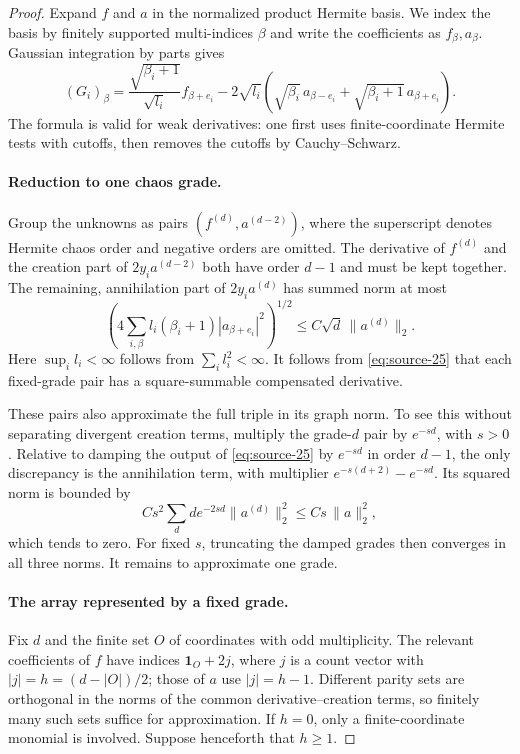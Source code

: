 \begin{proof}
Expand $f$ and $a$ in the normalized product Hermite basis. We index the
basis by finitely supported multi-indices $\beta$ and write the
coefficients as $f_\beta,a_\beta$. Gaussian integration by parts gives
\begin{equation}
 (G_i)_\beta
 =\frac{\sqrt{\beta_i+1}}{\sqrt{l_i}}f_{\beta+e_i}
 -2\sqrt{l_i}\left(
      \sqrt{\beta_i}\,a_{\beta-e_i}
      +\sqrt{\beta_i+1}\,a_{\beta+e_i}\right).
 \label{eq:source-25}
\end{equation}
The formula is valid for weak derivatives: one first uses finite-coordinate
Hermite tests with cutoffs, then removes the cutoffs by Cauchy--Schwarz.

\paragraph{Reduction to one chaos grade.}
Group the unknowns as pairs $(f^{(d)},a^{(d-2)})$, where the superscript
denotes Hermite chaos order and negative orders are omitted. The derivative
of $f^{(d)}$ and the creation part of $2y_i a^{(d-2)}$ both have order
$d-1$ and must be kept together. The remaining, annihilation part of
$2y_i a^{(d)}$ has summed norm at most
\[
 \left(4\sum_{i,\beta}l_i(\beta_i+1)
                  |a_{\beta+e_i}|^2\right)^{1/2}
 \le C\sqrt d\,\|a^{(d)}\|_2.
\]
Here $\sup_i l_i<\infty$ follows from $\sum_i l_i^2<\infty$.
It follows from \eqref{eq:source-25} that each fixed-grade pair has a
square-summable compensated derivative.

These pairs also approximate the full triple in its graph norm. To see
this without separating divergent creation terms, multiply the grade-$d$
pair by $e^{-sd}$, with $s>0$. Relative to damping the output of
\eqref{eq:source-25} by $e^{-sd}$ in order $d-1$, the only discrepancy
is the annihilation term, with multiplier
$e^{-s(d+2)}-e^{-sd}$. Its squared norm is bounded by
\[
 C s^2\sum_d d e^{-2sd}\|a^{(d)}\|_2^2
 \le C s\,\|a\|_2^2,
\]
which tends to zero. For fixed $s$, truncating the damped grades then
converges in all three norms. It remains to approximate one grade.

\paragraph{The array represented by a fixed grade.}
Fix $d$ and the finite set $O$ of coordinates with odd multiplicity.
The relevant coefficients of $f$ have indices
$\mathbf1_O+2j$, where $j$ is a count vector with
$|j|=h=(d-|O|)/2$; those of $a$ use $|j|=h-1$.
Different parity sets are orthogonal in the norms of the common
derivative--creation terms, so finitely many such sets suffice for
approximation. If $h=0$, only a finite-coordinate monomial is involved.
Suppose henceforth that $h\ge1$.


\end{proof}
